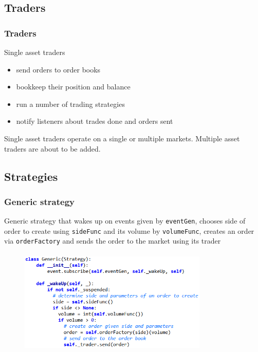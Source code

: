 \documentclass{beamer}
\begin{document}
\subsection{Traders}
\begin{frame}
\frametitle{Traders}
Single asset traders
\begin{itemize}
  \item send orders to order books
  \item bookkeep their position and balance
  \item run a number of trading strategies
  \item notify listeners about trades done and orders sent
\end{itemize}
Single asset traders operate on a single or multiple markets.
Multiple asset traders are about to be added.
\end{frame}

\subsection{Strategies}
\begin{frame}
\frametitle{Generic strategy}
Generic strategy that wakes up on events given by \texttt{eventGen}, 
chooses side of order to create using \texttt{sideFunc} and its volume by \texttt{volumeFunc},
creates an order via \texttt{orderFactory} and sends the order to the market using its trader
\begin{figure}[htbp]
\centering
\includegraphics[width=9cm, height=5cm]{python-generic.png}
\end{figure}
\end{frame}

\end{document}
